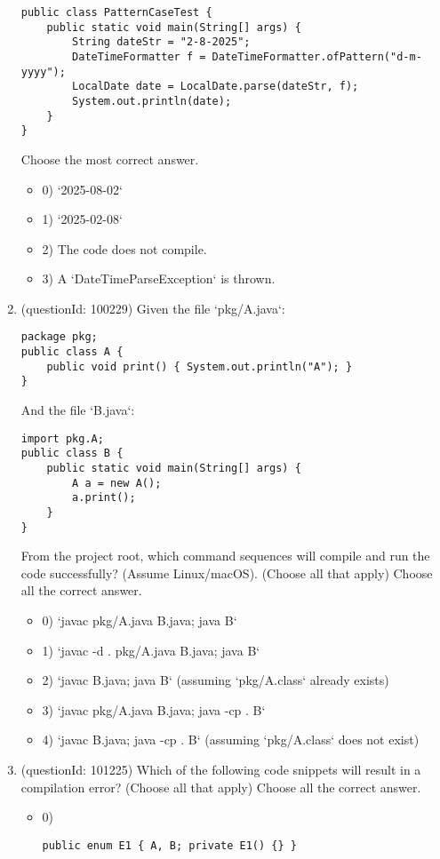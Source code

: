 \documentclass[12pt]{article}
\begin{document}
\begin{enumerate}[label=(\arabic*)]
\begin{verbatim}
public class PatternCaseTest {
    public static void main(String[] args) {
        String dateStr = "2-8-2025";
        DateTimeFormatter f = DateTimeFormatter.ofPattern("d-m-yyyy");
        LocalDate date = LocalDate.parse(dateStr, f);
        System.out.println(date);
    }
}
\end{verbatim}
Choose the most correct answer. 
\begin{itemize}
\item 0) `2025-08-02`

\item 1) `2025-02-08`

\item 2) The code does not compile.

\item 3) A `DateTimeParseException` is thrown.

\end{itemize}
\item (questionId: 100229) Given the file `pkg/A.java`:
\begin{verbatim}
package pkg;
public class A {
    public void print() { System.out.println("A"); }
}
\end{verbatim}
And the file `B.java`:
\begin{verbatim}
import pkg.A;
public class B {
    public static void main(String[] args) {
        A a = new A();
        a.print();
    }
}
\end{verbatim}
From the project root, which command sequences will compile and run the code successfully? (Assume Linux/macOS). (Choose all that apply)
Choose all the correct answer.\begin{itemize}
\item 0) `javac pkg/A.java B.java; java B`

\item 1) `javac -d . pkg/A.java B.java; java B`

\item 2) `javac B.java; java B` (assuming `pkg/A.class` already exists)

\item 3) `javac pkg/A.java B.java; java -cp . B`

\item 4) `javac B.java; java -cp . B` (assuming `pkg/A.class` does not exist)

\end{itemize}
\item (questionId: 101225) Which of the following code snippets will result in a compilation error? (Choose all that apply)
Choose all the correct answer.\begin{itemize}
\item 0) \begin{verbatim}public enum E1 { A, B; private E1() {} }\end{verbatim}


\end{itemize}
\end{enumerate}
\end{document}
